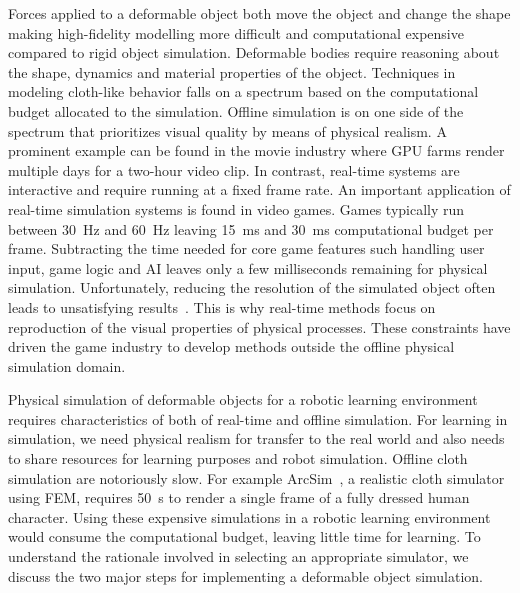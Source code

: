 \documentclass[\home/main.tex]{subfiles}
\begin{document}
Forces applied to a deformable object both move the object and change the shape making high-fidelity modelling more difficult and computational expensive compared to rigid object simulation. Deformable bodies require reasoning about the shape, dynamics and material properties of the object. Techniques in modeling cloth-like behavior falls on a spectrum based on the computational budget allocated to the simulation. Offline simulation is on one side of the spectrum that prioritizes visual quality by means of physical realism. A prominent example can be found in the movie industry where \gls{GPU} farms render multiple days for a two-hour video clip. In contrast, real-time systems are interactive and require running at a fixed frame rate. An important application of real-time simulation systems is found in video games. Games typically run between \SI{30}{\hertz} and \SI{60}{\hertz} leaving \SI{15}{\milli\second} and \SI{30}{\milli\second} computational budget per frame. Subtracting the time needed for core game features such handling user input, game logic and \gls{AI} leaves only a few milliseconds remaining for physical simulation. Unfortunately, reducing the resolution of the simulated object often leads to unsatisfying results~\autocite{muller2008real}. This is why real-time methods focus on reproduction of the visual properties of physical processes. These constraints have driven the game industry to develop methods outside the offline physical simulation domain.

Physical simulation of deformable objects for a robotic learning environment requires characteristics of both of real-time and offline simulation. For learning in simulation, we need physical realism for transfer to the real world and also needs to share resources for learning purposes and robot simulation. Offline cloth simulation are notoriously slow. For example ArcSim~\autocite{narain2012adaptive}, a realistic cloth simulator using \gls{FEM}, requires \SI{50}{\second} to render a single frame of a fully dressed human character. Using these expensive simulations in a robotic learning environment would consume the computational budget, leaving little time for learning. To understand the rationale involved in selecting an appropriate simulator, we discuss the two major steps for implementing a deformable object simulation.
\end{document}
